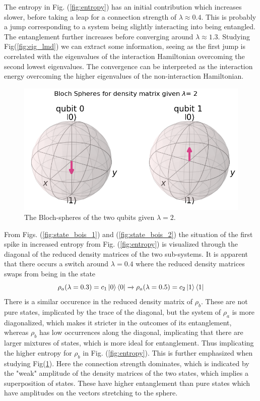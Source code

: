 The entropy in Fig. (\ref{fig:entropy}) has an initial contribution which increases slower, before taking a leap for a connection strength of $\lambda \approx 0.4$. This is probably a jump corresponding to a system being slightly interacting into being entangled. The entanglement further increases before converging around $\lambda \approx 1.3$. Studying Fig(\ref{fig:eig_lmd}) we can extract some information, seeing as the first jump is correlated with the eigenvalues of the interaction Hamiltonian overcoming the second lowest eigenvalues. The convergence can be interpreted as the interaction energy overcoming the higher eigenvalues of the non-interaction Hamiltonian.
\newline\newline
\begin{figure}
    \centering
    \includegraphics[width=\linewidth]{figs/bloch_entropy_lmd_2.PNG}
    \caption{The Bloch-spheres of the two qubits given $\lambda = 2$. }
    \label{fig:bloch_entropy}
\end{figure}
From Figs. (\ref{fig:state_bois_1}) and (\ref{fig:state_bois_2}) the situation of the first spike in increased entropy from Fig. (\ref{fig:entropy}) is visualized through the diagonal of the reduced density matrices of the two sub-systems. It is apparent that there occurs a switch around $\lambda = 0.4$ where the reduced density matrices swaps from being in the state $$\rho_a(\lambda = 0.3) = c_1 \ket{0}\bra{0} \xrightarrow{} \rho_a(\lambda = 0.5) = c_2 \ket{1}\bra{1}$$
There is a similar occurence in the reduced density matrix  of $\rho_b$. These are not pure states, implicated by the trace of the diagonal, but the system of $\rho_a$ is more diagonalized, which makes it stricter in the outcomes of its entanglement, whereas $\rho_b$ has low occurrences along the diagonal, implicating that there are larger mixtures of states, which is more ideal for entanglement. Thus implicating the higher entropy for $\rho_b$ in Fig. (\ref{fig:entropy}). This is further emphasized when studying Fig(\ref{fig:bloch_entropy}). Here the connection strength dominates, which is indicated by the "weak" amplitude of the density matrices of the two states, which implies a superposition of states. These have higher entanglement than pure states which have amplitudes on the vectors stretching to the sphere. \newline\newline



